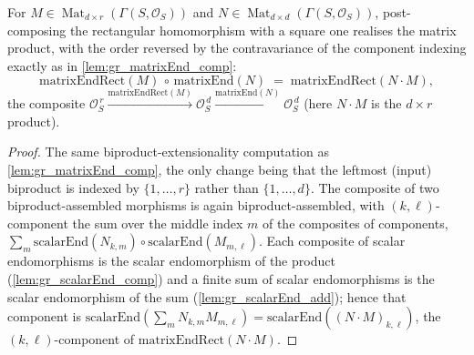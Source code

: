 \begin{lemma}\leanok
  \label{lem:gr_matrixEndRect_comp}
  For \(M \in \operatorname{Mat}_{d\times r}(\Gamma(S,\mathcal{O}_S))\) and
  \(N \in \operatorname{Mat}_{d\times d}(\Gamma(S,\mathcal{O}_S))\), post-composing the
  rectangular homomorphism with a square one realises the matrix product, with the order
  reversed by the contravariance of the component indexing exactly as in
  \cref{lem:gr_matrixEnd_comp}:
  \[
    \mathrm{matrixEndRect}(M) \,\circ\, \mathrm{matrixEnd}(N)
      \;=\; \mathrm{matrixEndRect}(N \cdot M),
  \]
  the composite \(\mathcal{O}_S^{\,r} \xrightarrow{\mathrm{matrixEndRect}(M)}
  \mathcal{O}_S^{\,d} \xrightarrow{\mathrm{matrixEnd}(N)} \mathcal{O}_S^{\,d}\) (here
  \(N \cdot M\) is the \(d \times r\) product).
\end{lemma}
\begin{proof}
  The same biproduct-extensionality computation as \cref{lem:gr_matrixEnd_comp}, the only
  change being that the leftmost (input) biproduct is indexed by \(\{1,\dots,r\}\) rather
  than \(\{1,\dots,d\}\). The composite of two biproduct-assembled morphisms is again
  biproduct-assembled, with \((k,\ell)\)-component the sum over the middle index \(m\) of the
  composites of components, \(\sum_m \mathrm{scalarEnd}(N_{k,m}) \circ
  \mathrm{scalarEnd}(M_{m,\ell})\). Each composite of scalar endomorphisms is the scalar
  endomorphism of the product (\cref{lem:gr_scalarEnd_comp}) and a finite sum of scalar
  endomorphisms is the scalar endomorphism of the sum (\cref{lem:gr_scalarEnd_add}); hence
  that component is \(\mathrm{scalarEnd}(\sum_m N_{k,m} M_{m,\ell}) =
  \mathrm{scalarEnd}((N\cdot M)_{k,\ell})\), the \((k,\ell)\)-component of
  \(\mathrm{matrixEndRect}(N\cdot M)\).
\end{proof}

